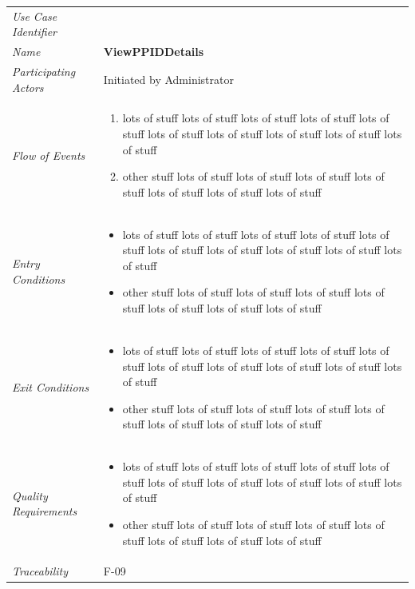 \documentclass[12pt,letterpaper]{article}
\begin{document}
\begin{center}
	\begin{tabu} to 
		\toprule
		Use Case Identifier & \viewppiddetails{} \\
		Name & {\bf ViewPPIDDetails} \\
		Participating Actors & Initiated by Administrator \\
		Flow of Events & 
	    \begin{enumerate}[topsep=-1em]
		    \item lots of stuff lots of stuff lots of stuff lots of stuff lots of stuff lots of stuff lots of stuff lots of stuff lots of stuff lots of stuff
		    \item other stuff lots of stuff lots of stuff lots of stuff lots of stuff lots of stuff lots of stuff lots of stuff
		\end{enumerate} \\

		Entry Conditions &
		\begin{itemize}[topsep=-1em]
		    \item lots of stuff lots of stuff lots of stuff lots of stuff lots of stuff lots of stuff lots of stuff lots of stuff lots of stuff lots of stuff
		    \item other stuff lots of stuff lots of stuff lots of stuff lots of stuff lots of stuff lots of stuff lots of stuff
        \end{itemize} \\

		Exit Conditions &
		\begin{itemize}[topsep=-1em]
		    \item lots of stuff lots of stuff lots of stuff lots of stuff lots of stuff lots of stuff lots of stuff lots of stuff lots of stuff lots of stuff
		    \item other stuff lots of stuff lots of stuff lots of stuff lots of stuff lots of stuff lots of stuff lots of stuff
        \end{itemize} \\

		Quality Requirements &
		\begin{itemize}[topsep=-1em]
		    \item lots of stuff lots of stuff lots of stuff lots of stuff lots of stuff lots of stuff lots of stuff lots of stuff lots of stuff lots of stuff
		    \item other stuff lots of stuff lots of stuff lots of stuff lots of stuff lots of stuff lots of stuff lots of stuff
        \end{itemize} \\

		Traceability & F-09 \\
		\toprule
	\end{tabu}
\end{center}
\end{document}

